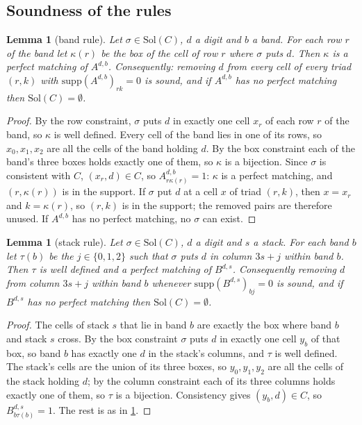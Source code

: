 \documentclass[11pt]{article}
\newtheorem{lemma}[theorem]{Lemma}
\theoremstyle{definition}
\theoremstyle{plain}
\begin{document}
\subsection{Soundness of the rules}

\begin{lemma}[band rule]
\label{lem:band}
Let $\sigma\in\mathrm{Sol}(C)$, $d$ a digit and $b$ a band. For each row $r$ of the band let $\kappa(r)$ be the box of
the cell of row $r$ where $\sigma$ puts $d$. Then $\kappa$ is a perfect matching of $A^{d,b}$. Consequently: removing $d$
from every cell of every triad $(r,k)$ with $\mathrm{supp}(A^{d,b})_{rk}=0$ is sound, and if $A^{d,b}$ has no perfect
matching then $\mathrm{Sol}(C)=\emptyset$.
\end{lemma}
\begin{proof}
By the row constraint, $\sigma$ puts $d$ in exactly one cell $x_r$ of each row $r$ of the band, so $\kappa$ is well
defined. Every cell of the band lies in one of its rows, so $x_0,x_1,x_2$ are all the cells of the band holding $d$. By
the box constraint each of the band's three boxes holds exactly one of them, so $\kappa$ is a bijection. Since $\sigma$
is consistent with $C$, $(x_r,d)\in C$, so $A^{d,b}_{r\kappa(r)}=1$: $\kappa$ is a perfect matching, and
$(r,\kappa(r))$ is in the support. If $\sigma$ put $d$ at a cell $x$ of triad $(r,k)$, then $x=x_r$ and $k=\kappa(r)$,
so $(r,k)$ is in the support; the removed pairs are therefore unused. If $A^{d,b}$ has no perfect matching, no
$\sigma$ can exist.
\end{proof}

\begin{lemma}[stack rule]
\label{lem:stack}
Let $\sigma\in\mathrm{Sol}(C)$, $d$ a digit and $s$ a stack. For each band $b$ let $\tau(b)$ be the $j\in\{0,1,2\}$ such that
$\sigma$ puts $d$ in column $3s+j$ within band $b$. Then $\tau$ is well defined and a perfect matching of $B^{d,s}$.
Consequently removing $d$ from column $3s+j$ within band $b$ whenever $\mathrm{supp}(B^{d,s})_{bj}=0$ is sound, and if
$B^{d,s}$ has no perfect matching then $\mathrm{Sol}(C)=\emptyset$.
\end{lemma}
\begin{proof}
The cells of stack $s$ that lie in band $b$ are exactly the box where band $b$ and stack $s$ cross. By the box
constraint $\sigma$ puts $d$ in exactly one cell $y_b$ of that box, so band $b$ has exactly one $d$ in the stack's
columns, and $\tau$ is well defined. The stack's cells are the union of its three boxes, so $y_0,y_1,y_2$ are all the
cells of the stack holding $d$; by the column constraint each of its three columns holds exactly one of them, so $\tau$
is a bijection. Consistency gives $(y_b,d)\in C$, so $B^{d,s}_{b\tau(b)}=1$. The rest is as in \cref{lem:band}.
\end{proof}
\end{document}
